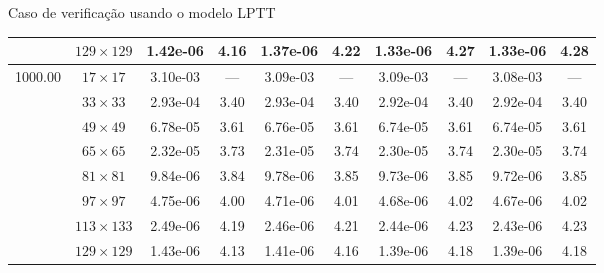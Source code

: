\begin{frame}{Caso de verificação usando o modelo LPTT}
\begin{table}[H]
{\begin{tabular*}{\textwidth}{@{\extracolsep\fill}cccccccccc@{}}
    & $129\times 129$ & 1.42e-06 & 4.16 & 1.37e-06 & 4.22 & 1.33e-06 & 4.27 & 1.33e-06 & 4.28 \\
    \hline
    \multirow{10}{*}{1000.00} & $17\times 17$ & 3.10e-03 & --- & 3.09e-03 & --- & 3.09e-03 & --- & 3.08e-03 & --- \\
    & $33\times 33$ & 2.93e-04 & 3.40 & 2.93e-04 & 3.40 & 2.92e-04 & 3.40 & 2.92e-04 & 3.40 \\
    & $49\times 49$ & 6.78e-05 & 3.61 & 6.76e-05 & 3.61 & 6.74e-05 & 3.61 & 6.74e-05 & 3.61 \\
    & $65\times 65$ & 2.32e-05 & 3.73 & 2.31e-05 & 3.74 & 2.30e-05 & 3.74 & 2.30e-05 & 3.74 \\
    & $81\times 81$ & 9.84e-06 & 3.84 & 9.78e-06 & 3.85 & 9.73e-06 & 3.85 & 9.72e-06 & 3.85 \\
    & $97\times 97$ & 4.75e-06 & 4.00 & 4.71e-06 & 4.01 & 4.68e-06 & 4.02 & 4.67e-06 & 4.02 \\
    & $113\times 133$ & 2.49e-06 & 4.19 & 2.46e-06 & 4.21 & 2.44e-06 & 4.23 & 2.43e-06 & 4.23 \\
    & $129\times 129$ & 1.43e-06 & 4.13 & 1.41e-06 & 4.16 & 1.39e-06 & 4.18 & 1.39e-06 & 4.18 \\
    \hline
    \end{tabular*}
}
\end{table}
\end{frame}

